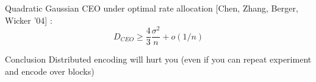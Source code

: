 \documentclass[mathserif]{beamer}
\begin{document}
\begin{frame}
Quadratic Gaussian CEO under optimal rate allocation [Chen, Zhang, Berger, Wicker '04] :
\[
 D_{CEO}  \geq \frac{4}{3} \frac{\sigma^2}{n} + o(1/n) 
\]
\pause
\begin{alertblock}{Conclusion}
Distributed encoding will hurt you (even if you can repeat experiment and encode over blocks)
\end{alertblock}
\bigskip
\end{frame}
\end{document}
